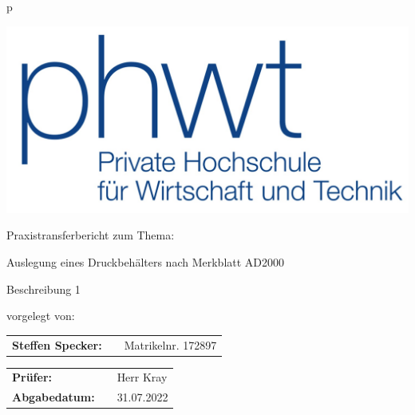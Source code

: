 \thispagestyle{empty}
\begin{tabular}{p{\textwidth}}

\vspace{1cm}

\begin{center}
\includegraphics[scale=1]{img/PHWT-Logo.jpg}\\
\end{center}

\vspace{0.5cm}

\begin{center}
\large{Praxistransferbericht zum Thema:\\}
\end{center}

\begin{center}
\Large{Auslegung eines Druckbehälters nach Merkblatt AD2000}
\end{center}

\vspace{0cm}

\begin{center}
Beschreibung 1\\
\end{center} 

\vspace{0.2cm}

\begin{center}
vorgelegt von: 
\end{center}

\begin{center}
    \begin{tabular}{lll}
        \textbf{Steffen Specker:} & & Matrikelnr. 172897
        \end{tabular} 
\end{center}

\vspace{0.2cm}

\begin{center}
\begin{tabular}{lll}
\textbf{Prüfer:} & & Herr Kray\\
\textbf{Abgabedatum:} & & 31.07.2022\\
\end{tabular}
\end{center}

\end{tabular}
